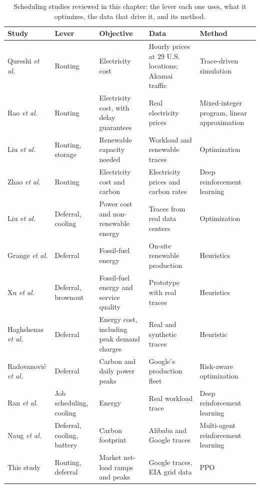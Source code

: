 \documentclass{UNCC-thesis}
\begin{document}
\begin{table}[htbp]
  \centering
  \footnotesize
  \caption[Summary of the reviewed scheduling studies]{Scheduling studies reviewed in this
  chapter: the lever each one uses, what it optimizes, the data that drive it, and its method.}
  \label{tab:lit-summary}
  \begin{tabular}{@{}L{0.16\textwidth}L{0.14\textwidth}L{0.20\textwidth}L{0.21\textwidth}L{0.16\textwidth}@{}}
    \toprule
    Study & Lever & Objective & Data & Method \\
    \midrule
    Qureshi \emph{et al.} \cite{qureshi2009cutting} & Routing & Electricity cost
      & Hourly prices at 29 U.S. locations; Akamai traffic & Trace-driven simulation \\
    Rao \emph{et al.} \cite{rao2010minimizing} & Routing & Electricity cost, with delay
      guarantees & Real electricity prices & Mixed-integer program, linear approximation \\
    Liu \emph{et al.} \cite{liu2011glb} & Routing, storage & Renewable capacity needed
      & Workload and renewable traces & Optimization \\
    Zhao \emph{et al.} \cite{zhao2025cfws} & Routing & Electricity cost and carbon
      & Electricity prices and carbon rates & Deep reinforcement learning \\
    \addlinespace
    Liu \emph{et al.} \cite{liu2012renewable} & Deferral, cooling & Power cost and
      non-renewable energy & Traces from real data centers & Optimization \\
    Grange \emph{et al.} \cite{grange2018green} & Deferral & Fossil-fuel energy
      & On-site renewable production & Heuristics \\
    Xu \emph{et al.} \cite{xu2021selfadaptive} & Deferral, brownout & Fossil-fuel energy and
      service quality & Prototype with real traces & Heuristics \\
    Haghshenas \emph{et al.} \cite{haghshenas2022infrastructure} & Deferral & Energy cost,
      including peak demand charges & Real and synthetic traces & Heuristic \\
    Radovanovi\'{c} \emph{et al.} \cite{radovanovic2021carbonaware} & Deferral & Carbon and daily
      power peaks & Google's production fleet & Risk-aware optimization \\
    \addlinespace
    Ran \emph{et al.} \cite{ran2019deepee} & Job scheduling, cooling & Energy
      & Real workload trace & Deep reinforcement learning \\
    Naug \emph{et al.} \cite{naug2024sustaindc} & Deferral, cooling, battery & Carbon footprint
      & Alibaba and Google traces & Multi-agent reinforcement learning \\
    \addlinespace
    This study & Routing, deferral & Market net-load ramps and peaks
      & Google traces, EIA grid data & PPO \\
    \bottomrule
  \end{tabular}
\end{table}
\end{document}
